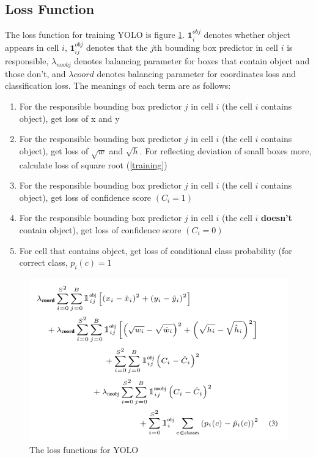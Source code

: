 \documentclass[extendedabs]{bmvc2k}
\begin{document}
\subsection{Loss Function}
The loss function for training YOLO is figure \ref{lossfunction}. $\mathbf{1}^{obj}_i$ denotes whether object appears in cell $i$, $\mathbf{1}^{obj}_{ij}$ denotes that the $j$th bounding box predictor in cell $i$ is responsible, $\lambda_{noobj} $ denotes balancing parameter for boxes that contain object and those don't, and $\lambda{coord}$ denotes balancing parameter for coordinates loss and classification loss. The meanings of each term are as follows:
\begin{enumerate}
    \item For the responsible bounding box predictor $j$ in cell $i$ (the cell $i$ contains object), get loss of x and y
    \item For the responsible bounding box predictor $j$ in cell $i$ (the cell $i$ contains object), get loss of $\sqrt{w}$ and $\sqrt{h}$. For reflecting deviation of small boxes more, calculate loss of square root (\ref{training})
    \item For the responsible bounding box predictor $j$ in cell $i$ (the cell $i$ contains object), get loss of confidence score $(C_i=1)$
    \item For the responsible bounding box predictor $j$ in cell $i$ (the cell $i$ \textbf{doesn't} contain object), get loss of confidence score $(C_i=0)$
    \item For cell that contains object, get loss of conditional class probability (for correct class, $p_i(c)=1$
\end{enumerate}

\begin{figure}[t]
	\includegraphics[width=\linewidth]{images/loss.PNG}
	\caption{
		The loss functions for YOLO}
	\vspace{-2mm}
 \label{lossfunction}
\end{figure}
\end{document}
